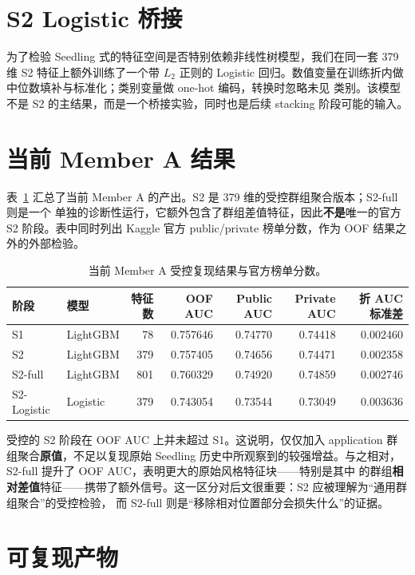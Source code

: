\documentclass[11pt,UTF8,fontset=windows]{ctexrep}
\begin{document}
\section{S2 Logistic 桥接}

为了检验 Seedling 式的特征空间是否特别依赖非线性树模型，我们在同一套 379 维 S2 特征上额外训练了一个带
$L_2$ 正则的 Logistic 回归。数值变量在训练折内做中位数填补与标准化；类别变量做 one-hot 编码，转换时忽略未见
类别。该模型不是 S2 的主结果，而是一个桥接实验，同时也是后续 stacking 阶段可能的输入。

\section{当前 Member A 结果}

表~\ref{tab:member-a-results} 汇总了当前 Member A 的产出。S2 是 379 维的受控群组聚合版本；S2-full 则是一个
单独的诊断性运行，它额外包含了群组差值特征，因此\textbf{不是}唯一的官方 S2 阶段。表中同时列出 Kaggle
官方 public/private 榜单分数，作为 OOF 结果之外的外部检验。

\begin{table}[h]
\centering
\caption{当前 Member A 受控复现结果与官方榜单分数。}
\label{tab:member-a-results}
\small
\setlength{\tabcolsep}{4pt}
\begin{tabular}{llrrrrr}
\toprule
阶段 & 模型 & 特征数 & OOF AUC & Public AUC & Private AUC & 折 AUC 标准差 \\
\midrule
S1 & LightGBM & 78 & 0.757646 & 0.74770 & 0.74418 & 0.002460 \\
S2 & LightGBM & 379 & 0.757405 & 0.74656 & 0.74471 & 0.002358 \\
S2-full & LightGBM & 801 & 0.760329 & 0.74920 & 0.74859 & 0.002746 \\
S2-Logistic & Logistic & 379 & 0.743054 & 0.73544 & 0.73049 & 0.003636 \\
\bottomrule
\end{tabular}
\end{table}

受控的 S2 阶段在 OOF AUC 上并未超过 S1。这说明，仅仅加入 application 群组聚合\textbf{原值}，不足以复现原始
Seedling 历史中所观察到的较强增益。与之相对，S2-full 提升了 OOF AUC，表明更大的原始风格特征块——特别是其中
的群组\textbf{相对差值}特征——携带了额外信号。这一区分对后文很重要：S2 应被理解为“通用群组聚合”的受控检验，
而 S2-full 则是“移除相对位置部分会损失什么”的证据。

\section{可复现产物}
\end{document}
